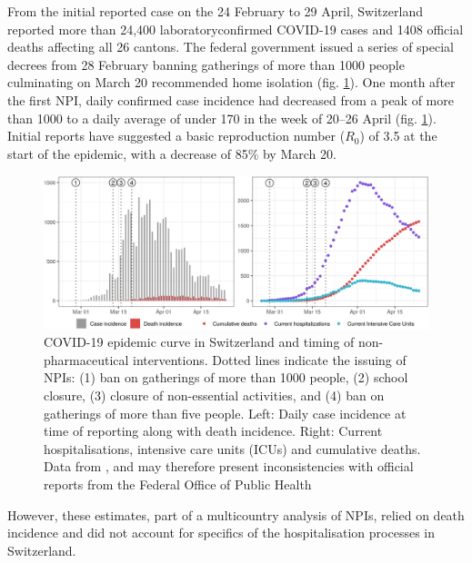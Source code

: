 From the initial reported case on the 24 February to 29 April, Switzerland reported more than 24,400 laboratoryconfirmed COVID-19 cases and 1408 official deaths affecting all 26 cantons\cite{OFSP:RapportSituationEpidemiologique:2020}. The federal government issued a series of special decrees from 28 February banning gatherings of more than 1000 people culminating on March 20 recommended home isolation (fig. \ref{fig:covid-ch-data}). One month after the first NPI, daily confirmed case incidence had decreased from a peak of more than 1000 to a daily average of under 170 in the week of 20–26 April (fig. \ref{fig:covid-ch-data}). Initial reports have suggested a basic reproduction number ($R_0$) of 3.5 at the start of the epidemic, with a decrease of 85\% by March 20\cite[-3\baselineskip]{Flaxman:Report13Estimating:2020}.
\begin{figure}\centering
  \includegraphics[width=\textwidth]{fig_covid-switzerland-npi/FIGURE_1.png}
  \caption[COVID-19 epidemic curve in Switzerland and timing of interventions.]{COVID-19 epidemic curve in Switzerland and timing of non-pharmaceutical interventions. Dotted lines indicate the issuing of NPIs: (1) ban on gatherings of more than 1000 people, (2) school closure, (3) closure of non-essential activities, and (4) ban on gatherings of more than five people. Left: Daily case incidence at time of reporting along with death incidence. Right: Current hospitalisations, intensive care units (ICUs) and cumulative deaths. Data from \textcite{Probst:DaenuprobstCovid19casesswitzerland:2020}, and may therefore present inconsistencies with official reports from the Federal Office of Public Health%
  }
  \label{fig:covid-ch-data}
\end{figure}
 However, these estimates, part of a multicountry analysis of NPIs, relied on death incidence and did not account for specifics of the hospitalisation processes in Switzerland. 
